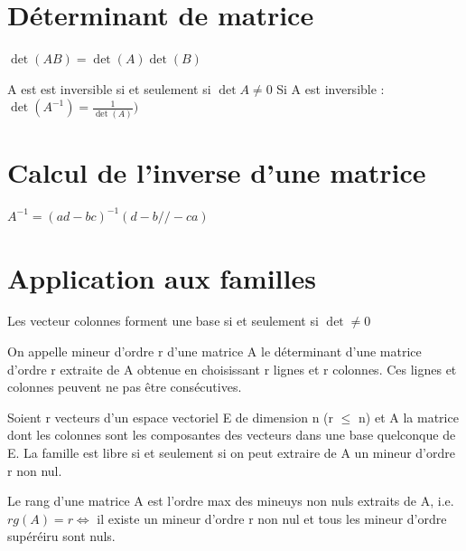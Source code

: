 \documentclass[french]{yLectureNote}
\begin{document}
\section{Déterminant de matrice}
\begin{theorem}
 \(\det(AB) = \det(A)\det(B)\)
\end{theorem}
\begin{theorem}
A est  est inversible si et seulement si \(\det A \neq 0\)
Si A est inversible : \(\det(A^{-1}) = \frac{1}{\det(A)})\)
\end{theorem}
\section{Calcul de l'inverse d'une matrice}
\begin{theorem}
 \(A^{-1} = (ad-bc)^{-1}(d -b // -c a)\)
\end{theorem}
\section{Application aux familles}
\begin{theorem}
 Les vecteur colonnes forment une base si et seulement si \(\det \neq 0\)
\end{theorem}
\begin{definition}[Mineur]
On appelle mineur d’ordre r d’une matrice A le déterminant d’une matrice d’ordre
r extraite de A obtenue en choisissant r lignes et r colonnes. Ces lignes et colonnes peuvent ne pas \^etre consécutives.
\end{definition}
\begin{theorem}
Soient r vecteurs d’un espace vectoriel E de dimension n (r \(\leq\) n) et
A la matrice dont les colonnes sont les composantes des vecteurs dans une base quelconque de E.
La famille est libre si et seulement si on peut extraire de A un mineur
d’ordre r non nul.
\end{theorem}
\begin{theorem}
 Le rang d'une matrice A est l'ordre max des mineuys non nuls extraits de A, i.e. \(rg(A) = r \iff\) il existe un mineur d'ordre r non nul et tous les mineur d'ordre supéréiru sont nuls.
\end{theorem}
\end{document}
